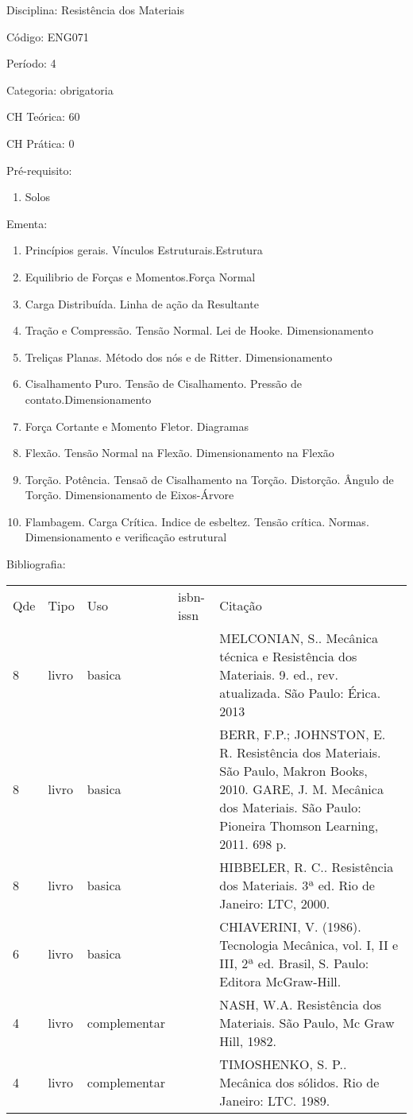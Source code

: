 \documentclass[12pt,a4paper,twoside]{report}
\begin{document}
Disciplina: Resistência dos Materiais

Código: ENG071

Período: 4

Categoria: obrigatoria

CH Teórica: 60

CH Prática: 0




Pré-requisito:
\begin{enumerate}
\item Solos
\end{enumerate}

Ementa:
\begin{enumerate}
\item Princípios gerais. Vínculos Estruturais.Estrutura
\item Equilibrio de Forças e Momentos.Força Normal
\item Carga Distribuída. Linha de ação da Resultante
\item Tração e Compressão. Tensão Normal. Lei de Hooke. Dimensionamento
\item Treliças Planas. Método dos nós e de Ritter. Dimensionamento
\item Cisalhamento Puro. Tensão de Cisalhamento. Pressão de contato.Dimensionamento
\item Força Cortante e Momento Fletor. Diagramas
\item Flexão. Tensão Normal na Flexão. Dimensionamento na Flexão
\item Torção. Potência. Tensaõ de Cisalhamento na Torção. Distorção. Ângulo de Torção. Dimensionamento de Eixos-Árvore
\item Flambagem. Carga Crítica. Indice de esbeltez. Tensão crítica. Normas. Dimensionamento e verificação estrutural
\end{enumerate}



Bibliografia:


\begin{tabular}{llllp{8cm}}
Qde & Tipo & Uso & isbn-issn & Citação \\
8&livro&basica&&MELCONIAN, S.. Mecânica técnica e Resistência dos Materiais. 9. ed., rev. atualizada. São Paulo: Érica. 2013\\
8&livro&basica&&BERR, F.P.; JOHNSTON, E. R. Resistência dos Materiais. São Paulo, Makron Books, 2010. GARE, J. M. Mecânica dos Materiais. São Paulo: Pioneira Thomson Learning, 2011. 698 p.\\
8&livro&basica&&HIBBELER, R. C.. Resistência dos Materiais. 3ª ed. Rio de Janeiro: LTC, 2000.\\
6&livro&basica&&CHIAVERINI, V. (1986). Tecnologia Mecânica, vol. I, II e III, 2ª ed. Brasil, S. Paulo: Editora McGraw-Hill.\\
4&livro&complementar&&NASH, W.A. Resistência dos Materiais. São Paulo, Mc Graw Hill, 1982.\\
4&livro&complementar&&TIMOSHENKO, S. P.. Mecânica dos sólidos. Rio de Janeiro: LTC. 1989.\\
\end{tabular}
\end{document}
